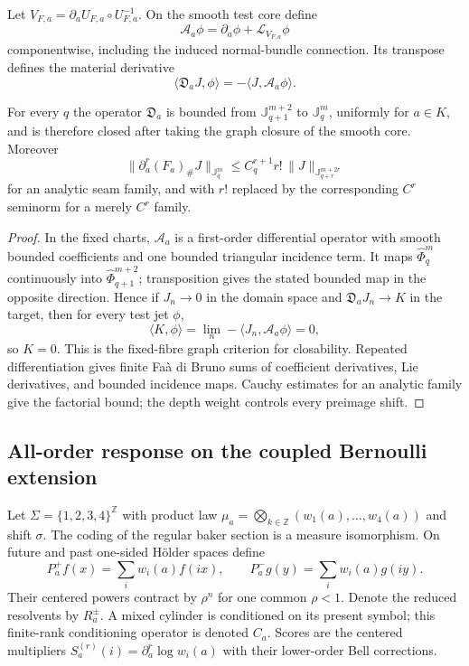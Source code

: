 Let $V_{F,a}=\partial_aU_{F,a}\circ U_{F,a}^{-1}$.  On the smooth test core
define
\[
 \mathcal A_a\phi=\partial_a\phi+
 \mathcal L_{V_{F,a}}\phi
\]
componentwise, including the induced normal-bundle connection.  Its transpose
defines the material derivative
\[
 \langle\mathfrak D_aJ,\phi\rangle
 =-\langle J,\mathcal A_a\phi\rangle .
\]

\begin{proposition}
\label{prop:r21-a1-derivative}
For every $q$ the operator $\mathfrak D_a$ is bounded from
$\mathbb J_{q+1}^{m+2}$ to $\mathbb J_q^m$, uniformly for $a\in K$, and is
therefore closed after taking the graph closure of the smooth core.  Moreover
\[
 \|\partial_a^r(F_a)_\#J\|_{\mathbb J_q^m}
 \le C_q^{r+1}r!\,
 \|J\|_{\mathbb J_{q+r}^{m+2r}}
\]
for an analytic seam family, and with $r!$ replaced by the corresponding
$C^r$ seminorm for a merely $C^r$ family.
\end{proposition}

\begin{proof}
In the fixed charts, $\mathcal A_a$ is a first-order differential operator
with smooth bounded coefficients and one bounded triangular incidence term.
It maps $\widehat\Phi_q^m$ continuously into
$\widehat\Phi_{q+1}^{m+2}$; transposition gives the stated bounded map in the
opposite direction.  Hence if $J_n\to0$ in the domain space and
$\mathfrak D_aJ_n\to K$ in the target, then for every test jet $\phi$,
\[
 \langle K,\phi\rangle
 =\lim_n-\langle J_n,\mathcal A_a\phi\rangle=0,
\]
so $K=0$.  This is the fixed-fibre graph criterion for closability.  Repeated
differentiation gives finite Fa\`a di Bruno sums of coefficient derivatives,
Lie derivatives, and bounded incidence maps.  Cauchy estimates for an
analytic family give the factorial bound; the depth weight controls every
preimage shift.
\end{proof}

\subsection{All-order response on the coupled Bernoulli extension}

Let $\Sigma=\{1,2,3,4\}^{\mathbb Z}$ with product law
$\mu_a=\bigotimes_{k\in\mathbb Z}(w_1(a),\ldots,w_4(a))$ and shift $\sigma$.
The coding of the regular baker section is a measure isomorphism.  On future
and past one-sided H\"older spaces define
\[
 P_a^+f(x)=\sum_iw_i(a)f(ix),
 \qquad
 P_a^-g(y)=\sum_iw_i(a)g(iy).
\]
Their centered powers contract by $\rho^n$ for one common $\rho<1$.  Denote
the reduced resolvents by $R_a^\pm$.  A mixed cylinder is conditioned on its
present symbol; this finite-rank conditioning operator is denoted $C_a$.
Scores are the centered multipliers
$S_a^{(r)}(i)=\partial_a^r\log w_i(a)$ with their lower-order Bell
corrections.


